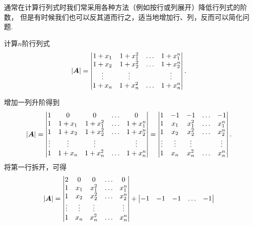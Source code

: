 通常在计算行列式时我们常采用各种方法（例如按行或列展开）降低行列式的阶数，
但是有时候我们也可以反其道而行之，适当地增加行、列，反而可以简化问题.
\begin{example}
计算\(n\)阶行列式\begin{equation*}
	\abs{\boldsymbol{A}} = \begin{vmatrix}
		1 + x_1 & 1 + x_1^2 & \dots & 1 + x_1^n \\
		1 + x_2 & 1 + x_2^2 & \dots & 1 + x_2^n \\
		\vdots & \vdots & & \vdots \\
		1 + x_n & 1 + x_n^2 & \dots & 1 + x_n^n
	\end{vmatrix}.
\end{equation*}
\begin{solution}
增加一列升阶得到\begin{equation*}
	\abs{\boldsymbol{A}} = \begin{vmatrix}
		1 & 0 & 0 & \dots & 0 \\
		1 & 1 + x_1 & 1 + x_1^2 & \dots & 1 + x_1^n \\
		1 & 1 + x_2 & 1 + x_2^2 & \dots & 1 + x_2^n \\
		\vdots & \vdots & \vdots & & \vdots \\
		1 & 1 + x_n & 1 + x_n^2 & \dots & 1 + x_n^n
	\end{vmatrix}
	= \begin{vmatrix}
		1 & -1 & -1 & \dots & -1 \\
		1 & x_1 & x_1^2 & \dots & x_1^n \\
		1 & x_2 & x_2^2 & \dots & x_2^n \\
		\vdots & \vdots & \vdots & & \vdots \\
		1 & x_n & x_n^2 & \dots & x_n^n
	\end{vmatrix}.
\end{equation*}
将第一行拆开，可得\begin{equation*}
	\abs{\boldsymbol{A}} = \begin{vmatrix}
		2 & 0 & 0 & \dots & 0 \\
		1 & x_1 & x_1^2 & \dots & x_1^n \\
		1 & x_2 & x_2^2 & \dots & x_2^n \\
		\vdots & \vdots & \vdots & & \vdots \\
		1 & x_n & x_n^2 & \dots & x_n^n
	\end{vmatrix}
	+ \begin{vmatrix}
		-1 & -1 & -1 & \dots & -1 \\

\end{vmatrix}
\end{equation*}
\end{solution}
\end{example}
